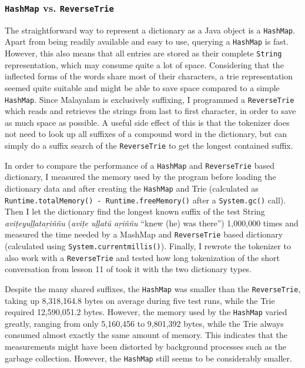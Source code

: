 \documentclass[a4paper]{article}
\newcommand{\typ}[1]{\texttt{#1}}
\begin{document}
\subsubsection*{\typ{HashMap} vs. \typ{ReverseTrie}}

The straightforward way to represent a dictionary as a Java object is a \typ{HashMap}. Apart from being readily available and easy to use, querying a \typ{HashMap} is fast. However, this also means that all entries are stored as their complete \typ{String} representation, which may consume quite a lot of space. Considering that the inflected forms of the words share most of their characters, a trie representation seemed quite suitable and might be able to save space compared to a simple \typ{HashMap}. Since Malayalam is exclusively suffixing, I programmed a \typ{ReverseTrie} which reads and retrieves the strings from last to first character, in order to save as much space as possible. A useful side effect of this is that the tokenizer does not need to look up all suffixes of a compound word in the dictionary, but can simply do a suffix search of the \typ{ReverseTrie} to get the longest contained suffix.

In order to compare the performance of a \typ{HashMap} and \typ{ReverseTrie} based dictionary, I measured the memory used by the program before loading the dictionary data and after creating the \typ{HashMap} and Trie (calculated as \typ{Runtime.totalMemory() - Runtime.freeMemory()} after a \typ{System.gc()} call). Then I let the dictionary find the longest known suffix of the test String \textit{aviṭeyuḷḷataṟiññu} (\textit{aviṭe uḷḷatŭ aṟiññu} ``knew (he) was there'') 1,000,000 times and measured the time needed by a MashMap and \typ{ReverseTrie} based dictionary (calculated using \typ{System.currentmillis()}). Finally, I rewrote the tokenizer to also work with a \typ{ReverseTrie} and tested how long tokenization of the short conversation from lesson 11 of \textcite[p.164f]{moag} took it with the two dictionary types.

Despite the many shared suffixes, the \typ{HashMap} was smaller than the \typ{ReverseTrie}, taking up 8,318,164.8 bytes on average during five test runs, while the Trie required 12,590,051.2 bytes. However, the memory used by the \typ{HashMap} varied greatly, ranging from only 5,160,456 to 9,801,392 bytes, while the Trie always consumed almost exactly the same amount of memory. This indicates that the measurements might have been distorted by background processes such as the garbage collection. However, the \typ{HashMap} still seems to be considerably smaller.
\end{document}
